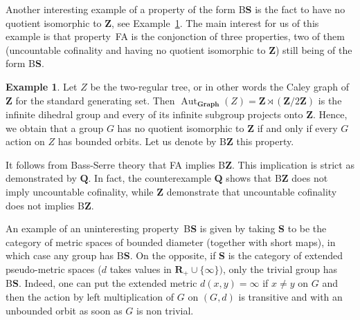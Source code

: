 \documentclass[a4paper]{article}
\theoremstyle{definition}
\newtheorem{exmp}[lem]{Example}
\DeclareMathOperator\Aut{Aut}
\newcommand*{\field}[1]{\mathbf{#1}}
\newcommand*{\category}[1]{\textbf{#1}}
\newcommand*{\CatS}{\category{S}}
\newcommand*{\Z}{\field{Z}}
\newcommand*{\R}{\field{R}}
\newcommand*{\BS}{B\textbf{S}}
\newcommand*{\BZ}{B\textbf{Z}}
\newcommand*{\FA}{FA}
\begin{document}
Another interesting example of a property of the form \BS{} is the fact to have no quotient isomorphic to $\Z$, see Example~\ref{Exmp:BZ}.
The main interest for us of this example is that property~\FA{} is the conjonction of three properties, two of them (uncountable cofinality and having no quotient isomorphic to $\Z$) still being of the form \BS.
%
%
\begin{exmp}\label{Exmp:BZ}
Let $Z$ be the two-regular tree, or in other words the Caley graph of $\Z$ for the standard generating set.
Then $\Aut_{\mathbf{Graph}}(Z)=\Z\rtimes (\Z/2\Z)$ is the infinite dihedral group and every of its infinite subgroup projects onto $\Z$.
Hence, we obtain that a group $G$ has no quotient isomorphic to $\Z$ if and only if every $G$ action on $Z$ has bounded orbits.
Let us denote by \BZ{} this property.

It follows from Bass-Serre theory that \FA{} implies \BZ. This implication is strict as demonstrated by $\field{Q}$.
In fact, the counterexample $\field{Q}$ shows that \BZ{} does not imply uncountable cofinality, while $\Z$ demonstrate that uncountable cofinality does not implies \BZ.
\end{exmp}
%
%
An example of an uninteresting property~\BS{} is given by taking \CatS{} to be the category of metric spaces of bounded diameter (together with short maps), in which case any group has \BS.
On the opposite, if \CatS{} is the category of extended pseudo-metric spaces ($d$ takes values in $\R_+\cup\{\infty\})$, only the trivial group has \BS.
Indeed, one can put the extended metric $d(x,y)=\infty$ if $x\neq y$ on $G$ and then the action by left multiplication of $G$ on $(G,d)$ is transitive and with an unbounded orbit as soon as $G$ is non trivial.
\end{document}
